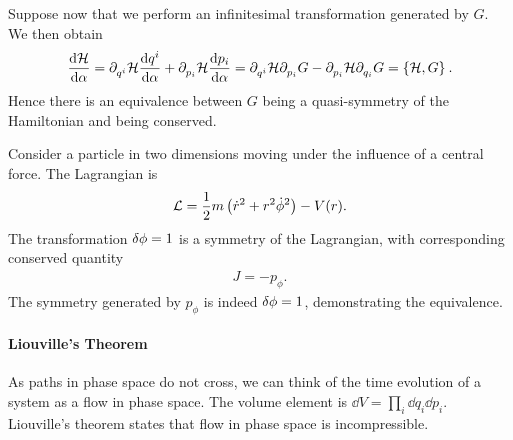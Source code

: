 
Suppose now that we perform an infinitesimal transformation generated by $G$. We then obtain
\begin{align*}
	\dv{\ensuremath{\mathcal{H}}}{\alpha} = \partial^{}_{q^{i}}\mathcal{H}\dv{q^{i}}{\alpha} + \partial^{}_{p_{i}}\mathcal{H}\dv{p_{i}}{\alpha} = \partial^{}_{q^{i}}\mathcal{H}\partial^{}_{p_{i}}G - \partial^{}_{p_{i}}\mathcal{H}\partial^{}_{q_{i}}G = \left\{\mathcal{H}, G\right\}_{}.
\end{align*}
Hence there is an equivalence between $G$ being a quasi-symmetry of the Hamiltonian and being conserved.

Consider a particle in two dimensions moving under the influence of a central force. The Lagrangian is
\begin{align*}
	\mathcal{L} = \frac{1}{2}m\left(\dot{r}^{2} + r^{2}\dot{\phi}^{2}\right) - V(r).
\end{align*}
The transformation $\var{\phi} = 1$ is a symmetry of the Lagrangian, with corresponding conserved quantity
\begin{align*}
	J = -p_{\phi}.
\end{align*}
The symmetry generated by $p_{\phi}$ is indeed $\var{\phi} = 1$, demonstrating the equivalence.

\paragraph{Liouville's Theorem}
As paths in phase space do not cross, we can think of the time evolution of a system as a flow in phase space. The volume element is $\dd{V} = \prod\limits_{i}\dd{q_{i}}\dd{p_{i}}$. Liouville's theorem states that flow in phase space is incompressible.

